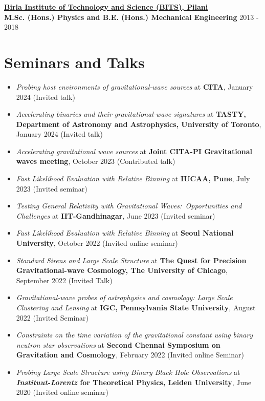 \documentclass[11pt, margin, centered, letterpaper]{res}
\begin{document}
\begin{resume}
\textbf{\href{http://www.bits-pilani.ac.in/}{Birla Institute of Technology and Science (BITS), Pilani}}\\
\textbf{M.Sc. (Hons.) Physics and B.E. (Hons.) Mechanical Engineering} \hfill 2013 - 2018


\section{Seminars and Talks}
\begin{itemize}[leftmargin=*]
    \item \textit{Probing host environments of gravitational-wave sources} at \textbf{CITA}, January 2024 (Invited talk)
    \item \textit{Accelerating binaries and their gravitational-wave signatures} at \textbf{TASTY, Department of Astronomy and Astrophysics, University of Toronto}, January 2024 (Invited talk)
    \item \textit{Accelerating gravitational wave sources} at \textbf{Joint CITA-PI Gravitational waves meeting}, October 2023 (Contributed talk)
    \item \textit{Fast Likelihood Evaluation with Relative Binning} at\textbf{ IUCAA, Pune}, July 2023 (Invited seminar)
    \item \textit{Testing General Relativity with Gravitational Waves:\ Opportunities and Challenges} at \textbf{IIT-Gandhinagar}, June 2023 (Invited seminar)
    \item \textit{Fast Likelihood Evaluation with Relative Binning} at \textbf{Seoul National University}, October 2022 (Invited online seminar)
    \item \textit{Standard Sirens and Large Scale Structure} at \textbf{The Quest for Precision Gravitational-wave Cosmology, The University of Chicago}, September 2022 (Invited Talk)    \item \textit{Gravitational-wave probes of astrophysics and cosmology: Large Scale Clustering and Lensing} at \textbf{IGC, Pennsylvania State University}, August 2022 (Invited Seminar)
	 \item \textit{Constraints on the time variation of the gravitational constant using binary neutron star observations} at \textbf{Second Chennai Symposium on Gravitation and Cosmology}, February 2022 (Invited online Seminar)
	 \item \textit{Probing Large Scale Structure using Binary Black Hole Observations} at \textbf{\textit{Instituut-Lorentz} for Theoretical Physics, Leiden University}, June 2020 (Invited online seminar)

\end{itemize}
\end{resume}
\end{document}

